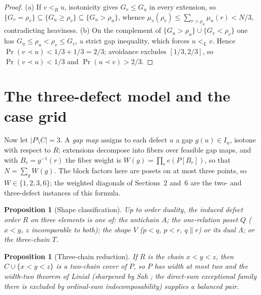 \documentclass[11pt]{article}
\newtheorem{proposition}[theorem]{Proposition}
\theoremstyle{definition}
\theoremstyle{remark}
\newcommand{\pr}{\operatorname{Pr}}
\begin{document}
\begin{proof}
(a) If $v<_Ru$, isotonicity gives $G_v\le G_u$ in every extension, so
$\{G_v=\rho_v\}\subseteq\{G_u\ge\rho_v\}\subseteq\{G_u>\rho_u\}$, whence
$\mu_v(\rho_v)\le\sum_{r>\rho_u}\mu_u(r)<N/3$, contradicting heaviness.
(b) On the complement of $\{G_u>\rho_u\}\cup\{G_v<\rho_v\}$ one has
$G_u\le\rho_u<\rho_v\le G_v$, a strict gap inequality, which forces $u<_Lv$. Hence
$\pr(v\prec u)<1/3+1/3=2/3$; avoidance excludes $[1/3,2/3]$, so $\pr(v\prec u)<1/3$ and
$\pr(u\prec v)>2/3$.
\end{proof}

\section{The three-defect model and the case grid}\label{sec:model}
Now let $|P\setminus C|=3$. A \emph{gap map} assigns to each defect $u$ a gap
$g(u)\in I_u$, isotone with respect to $R$; extensions decompose into fibers over
feasible gap maps, and with $B_r=g^{-1}(r)$ the fiber weight is
$W(g)=\prod_re\!\left(P[B_r]\right)$, so that $N=\sum_gW(g)$. The block factors here are
posets on at most three points, so $W\in\{1,2,3,6\}$; the weighted diagonals of
Sections~2 and~6 are the two- and three-defect instances of this formula.

\begin{proposition}[Shape classification]\label{prop:shapes}
Up to order duality, the induced defect order $R$ on three elements is one of: the
antichain $A$; the one-relation poset $Q$ ($x<y$, $z$ incomparable to both); the shape
$V$ ($p<q$, $p<r$, $q\parallel r$) or its dual $\Lambda$; or the three-chain $T$.
\end{proposition}

\begin{proposition}[Three-chain reduction]\label{prop:threechain}
If $R$ is the chain $x<y<z$, then $C\cup\{x<y<z\}$ is a two-chain cover of $P$, so $P$
has width at most two and the width-two theorem of Linial \cite{linial} (sharpened by Sah
\cite{sah}; the direct-sum exceptional family there is excluded by ordinal-sum
indecomposability) supplies a balanced pair.
\end{proposition}
\end{document}
